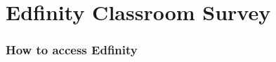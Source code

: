 \documentclass[slidestop,compress,mathserif]{beamer}
\begin{document}



\section{Edfinity Classroom Survey}

\begin{frame}
	\frametitle{How to access Edfinity} %
\end{frame}





\end{document}
